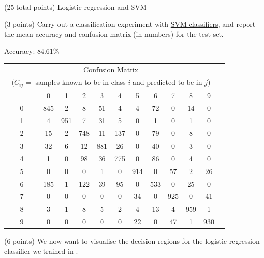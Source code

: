 \documentclass[12pt]{article}
\begin{document}
\begin{question}{(25 total points) Logistic regression and SVM}
\begin{subquestion}
   \end{subquestion}
   \begin{subquestion}{(3 points)
       Carry out a classification experiment with
       \href{https://scikit-learn.org/0.19/modules/generated/sklearn.svm.SVC.html}{SVM classifiers}, and report the
       mean accuracy and confusion matrix (in numbers) for the test
       set.
     } \label{Q2.2}


   

      \begin{answerbox}{30em}
             Accuracy: 84.61\% \\
    		\begin{tabular}{|c|c|c|c|c|c|c|c|c|c|c|c|}
      		\hline 
      		\multicolumn{11}{|c|}{Confusion Matrix}\\
      		\multicolumn{11}{|c|}{$(C_{ij} = $ samples known to be in class $i$ and predicted to be in $j$)}
      		 \\ \hline
\ \ \ \ \ \ \ \ & 0 & 1 & 2 & 3 & 4 & 5 & 6 & 7 & 8 & 9\\ \hline
0 & 845 & 2 & 8 & 51 & 4 & 4 & 72 & 0 & 14 & 0 \\ \hline 
1 & 4 & 951 & 7 & 31 & 5 & 0 & 1 & 0 & 1 & 0 \\ \hline 
2 & 15 & 2 & 748 & 11 & 137 & 0 & 79 & 0 & 8 & 0 \\ \hline 
3 & 32 & 6 & 12 & 881 & 26 & 0 & 40 & 0 & 3 & 0 \\ \hline 
4 & 1 & 0 & 98 & 36 & 775 & 0 & 86 & 0 & 4 & 0 \\ \hline 
5 & 0 & 0 & 0 & 1 & 0 & 914 & 0 & 57 & 2 & 26 \\ \hline 
6 & 185 & 1 & 122 & 39 & 95 & 0 & 533 & 0 & 25 & 0 \\ \hline 
7 & 0 & 0 & 0 & 0 & 0 & 34 & 0 & 925 & 0 & 41 \\ \hline 
8 & 3 & 1 & 8 & 5 & 2 & 4 & 13 & 4 & 959 & 1 \\ \hline 
9 & 0 & 0 & 0 & 0 & 0 & 22 & 0 & 47 & 1 & 930
			\\\hline
      		\end{tabular} 
      \end{answerbox}
  


   \end{subquestion}
   \begin{subquestion}{(6 points)
       We now want to visualise the decision regions for the logistic
       regression classifier we trained in .
     } \label{Q2.3}



\end{subquestion}
\end{question}
\end{document}
